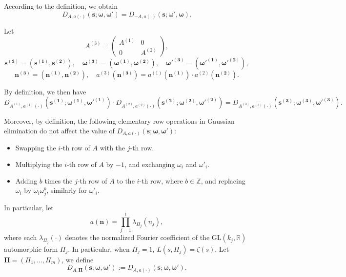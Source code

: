 \documentclass[12pt,reqno]{amsart}
\numberwithin{equation}{section}
\theoremstyle{plain}
\theoremstyle{definition}
\theoremstyle{remark}
\begin{document}
According to the definition, we obtain
\[
D_{A, a(\boldsymbol{\cdot})}(\boldsymbol{s}; \boldsymbol{\omega},\boldsymbol{\omega'}) =
D_{-A, a(\boldsymbol{\cdot})}(\boldsymbol{s};
\boldsymbol{\omega'},\boldsymbol{\omega}).
\]

Let
\[
A^{(3)}= \begin{pmatrix} A^{(1)} & 0 \\ 0 & A^{(2)} \end{pmatrix},
\]
\[
\boldsymbol{s^{(3)}} = (\boldsymbol{s^{(1)}}, \boldsymbol{s^{(2)}}), \quad
\boldsymbol{\omega^{(3)}} = (\boldsymbol{\omega^{(1)}}, \boldsymbol{\omega^{(2)}}), \quad
\boldsymbol{\omega'^{(3)}} = (\boldsymbol{\omega'^{(1)}}, \boldsymbol{\omega'^{(2)}}),
\]
\[
\boldsymbol{n^{(3)}} = (\boldsymbol{n^{(1)}}, \boldsymbol{n^{(2)}}), \quad
a^{(3)}(\boldsymbol{n^{(3)}}) = a^{(1)}(\boldsymbol{n^{(1)}}) \cdot a^{(2)}(\boldsymbol{n^{(2)}}).
\]

By definition, we then have
\[
D_{A^{(1)}, a^{(1)}(\cdot)}(\boldsymbol{s^{(1)}}; \boldsymbol{\omega^{(1)}}, \boldsymbol{\omega'^{(1)}}) \cdot D_{A^{(2)}, a^{(2)}(\cdot)}(\boldsymbol{s^{(2)}}; \boldsymbol{\omega^{(2)}}, \boldsymbol{\omega'^{(2)}}) = D_{A^{(3)}, a^{(3)}(\cdot)}(\boldsymbol{s^{(3)}}; \boldsymbol{\omega^{(3)}}, \boldsymbol{\omega'^{(3)}}).
\]

Moreover, by definition, the following elementary row operations in Gaussian elimination do not affect the value of \( D_{A, a(\cdot)}(\boldsymbol{s}; \boldsymbol{\omega}, \boldsymbol{\omega'}) \):
\begin{itemize}
\item Swapping the \( i \)-th row of \( A \) with the \( j \)-th row.
  \item Multiplying the \( i \)-th row of \( A \) by \(-1\), and exchanging \(\omega_i\) and \(\omega'_i\).
  \item Adding \( b \) times the \( j \)-th row of \( A \) to the \( i \)-th row, where \( b \in \mathbb{Z} \), and replacing \(\omega_i\) by \(\omega_i \omega_j^b\), similarly for \(\omega'_i\).
\end{itemize}

In particular, let
\[
a(\boldsymbol{n}) = \prod_{j=1}^{t} \lambda_{\Pi_j}(n_j),
\]
where each \(\lambda_{\Pi_j}(\cdot)\) denotes the normalized Fourier coefficient of the \(\mathrm{GL}(k_j,\mathbb{R})\) automorphic form \(\Pi_j\).
In particular, when $\Pi_j = \mathrm{1}$, $L(s, \Pi_j)=\zeta(s)$.
Let $\boldsymbol{\Pi}=(\Pi_1,\dots,\Pi_m)$, we define
\[
D_{A, \boldsymbol{\Pi}}(\boldsymbol{s}; \boldsymbol{\omega}, \boldsymbol{\omega'}) := D_{A,a(\boldsymbol{\cdot})}(\boldsymbol{s}; \boldsymbol{\omega}, \boldsymbol{\omega'}).
\]
\end{document}
